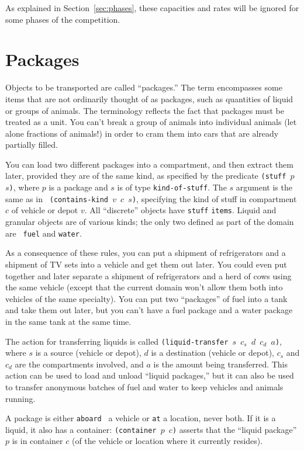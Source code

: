 \documentclass{article}
\begin{document}
As explained in Section~\ref{sec:phases}, these capacities and rates
will be ignored 
for some phases of the competition.

\section{Packages}

Objects to be transported are called ``packages.''  The term
encompasses some items that are not ordinarily thought of as packages,
such as quantities of liquid or groups of animals.  The terminology
reflects the fact that packages must be treated as a unit.  You can't 
break a group of animals into individual animals (let alone fractions
of animals!) in order to cram them into cars that are already
partially filled.  

You can load two different packages into a compartment, and then extract
them later, provided they are of the same kind, as specified by the
predicate {\tt (stuff $p$ $s$)}, where $p$ is a package and $s$ is of
type {\tt kind-of-stuff}.  The $s$ argument is the same as in {\tt
(contains-kind $v$ $c$ $s$)}, specifying the kind of stuff in
compartment $c$ of vehicle or depot $v$.
All ``discrete'' objects
have {\tt stuff} {\tt items}.  Liquid and granular objects are of
various kinds; the only two defined as part of the domain are {\tt
fuel} and {\tt water}.  

As a consequence of these rules, you can put a shipment of
refrigerators and a shipment of TV sets into a vehicle and get them
out later.  You could even put together and later separate a shipment
of refrigerators and a herd 
of cows using the same vehicle (except that the current domain won't
allow them both into vehicles of the same specialty).
You can put two 
``packages'' of fuel
into a tank and take them out later, but you
can't have a fuel package and a water package in the same tank at
the same time.

The action for transferring liquids is called {\tt (liquid-transfer
$s$ $c_s$ $d$ $c_d$ $a$)}, where $s$ is a source (vehicle or depot),
$d$ is a destination (vehicle or depot), $c_s$ and $c_d$ are the
compartments involved, and $a$ is the amount being transferred.  This
action can be used to load and unload ``liquid packages,'' but it can
also be used to transfer anonymous batches of fuel and water to keep
vehicles and animals running.  

A package is either {\tt aboard } a vehicle or {\tt at} a location,
never both.
If it is a liquid, it also has a container: {\tt (container $p$ $c$)}
asserts that the ``liquid package'' $p$ is in container $c$ (of the
vehicle or location where it currently resides).
\end{document}
